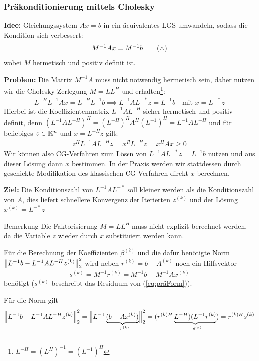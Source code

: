 \subsubsection{Präkonditionierung mittels Cholesky}
\textbf{Idee:} 
Gleichungssystem $Ax=b$ in ein äquivalentes LGS umwandeln, sodass die Kondition sich verbessert: 
  \begin{align*}
    M^{-1}Ax = M^{-1}b  \tag{{\scriptsize$\triangle$}} \label{eq:präForm}
  \end{align*}
wobei $M$ hermetisch und positiv definit ist. 

\textbf{Problem:} 
Die Matrix $M^{-1}A$ muss nicht notwendig hermetisch sein, daher nutzen wir die 
Cholesky-Zerlegung $M=LL^H$
und erhalten\footnote{$L^{-H} = (L^H)^{-1} = (L^{-1})^H$}: 
%
\begin{align*}
  L^{-H}L^{-1}Ax = L^{-H}L^{-1}b \implies L^{-1}AL^{-*}z = L^{-1}b \quad \text{mit } x = L^{-*}z
\end{align*}
%
Hierbei ist die Koeffizientenmatrix $L^{-1}AL^{-H}$ sicher hermetisch und positiv definit, 
denn $(L^{-1}AL^{-H})^H = (L^{-H})^HA^H(L^{-1})^H = L^{-1}AL^{-H}$ und für beliebiges 
$z\in\mathbb K^n$ und $x=L^{-H}z$ gilt: 
%
\begin{align*}
  z^HL^{-1}AL^{-H}z 
  = x^HL^{-H}z 
  = x^HAx \geq 0
\end{align*}
%
Wir können also CG-Verfahren zum Lösen von $L^{-1}AL^{-*}z = L^{-1}b$ nutzen und aus dieser Lösung 
dann $x$ bestimmen. In der Praxis werden wir stattdessen durch geschickte Modifikation des klassischen 
CG-Verfahren direkt $x$ berechnen.

\textbf{Ziel:} Die Konditionszahl von $L^{-1}AL^{-*}$ soll kleiner werden als die Konditionszahl von $A$, dies 
liefert schnellere Konvergenz der Iterierten $z^{(k)}$ und der Lösung $x^{(k)}=L^{-*}z$ 

\begin{colbox}{Bemerkung}
  Die Faktorisierung $M=LL^H$ muss nicht explizit berechnet werden, 
  da die Variable $z$ wieder durch $x$ substituiert werden kann.

  Für die Berechnung der Koeffizienten $\beta^{(k)}$ und die dafür benötigte Norm 
  $\vertn{2}{L^{-1}b-L^{-1}AL^{-H}z^{(k)}}_2^2$ wird neben $r^{(k)} = b-A^{(k)}$ noch ein Hilfsvektor 
  \begin{align*}
    s^{(k)} = M^{-1}r^{(k)} = M^{-1}b - M^{-1}Ax^{(k)}
  \end{align*}
  benötigt ($s^{(k)}$ beschreibt das Residuum von (\ref{eq:präForm})).
  
  Für die Norm gilt 
  \begin{align*}
    \vertn{2}{L^{-1}b-L^{-1}AL^{-H}z^{(k)}}_2^2 
    = \Big\|{L^{-1}\underbrace{(b-Ax^{(k)})}_{=r^{(k)}}}\Big\|_2^2
    = ({r^{(k)H}}\underbrace{L^{-H})(L^{-1}r^{(k)}}_{=s^{(k)}}) 
    = {r^{(k)H}}s^{(k)}
  \end{align*}
\end{colbox}

